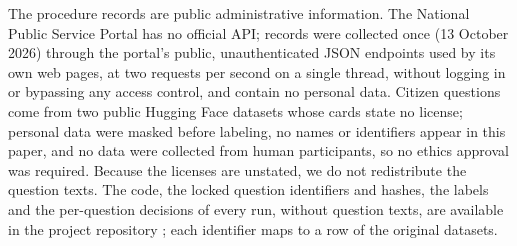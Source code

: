 The procedure records are public administrative information. The National Public Service Portal has no official API; records were
collected once (13 October 2026) through the portal's public, unauthenticated JSON endpoints used by its own web pages, at two requests per
second on a single thread, without logging in or bypassing any access control, and contain no personal data. Citizen questions come from two
public Hugging Face datasets whose cards state no license; personal data were masked before labeling, no names or identifiers appear in this
paper, and no data were collected from human participants, so no ethics approval was required. Because the licenses are unstated, we do not redistribute the question texts. The
code, the locked question identifiers and hashes, the labels and the per-question decisions of every run, without question texts, are
available in the project repository ; each identifier maps to a row of the original datasets.
